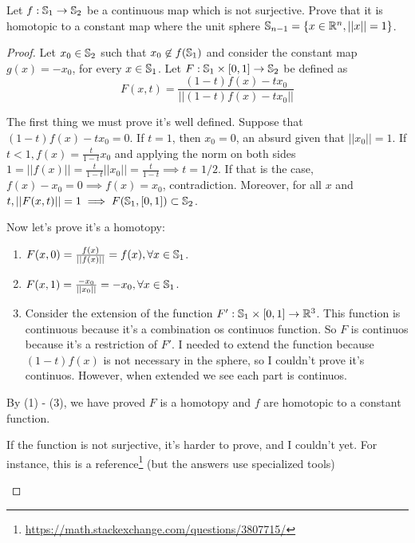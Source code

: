 \noindent\linia

\begin{exercise}
    Let $f : \mathbb{S}_1 \to \mathbb{S}_2$ be a continuous map which is not
    surjective. Prove that it is homotopic to a constant map where the unit sphere $\mathbb{S}_{n-1} = \{x \in \mathbb{R}^n,
    ||x|| = 1\}$. 
\end{exercise}

\begin{proof}

Let $x_0 \in \mathbb{S}_2$ such that $x_0 \not\in f(\mathbb{S}_1)$ and
consider the constant map $g(x) = -x_0$, for every $x \in \mathbb{S}_1$. Let
$F: \mathbb{S}_1 \times [0,1] \to \mathbb{S}_2$ be defined as 
$$
F(x,t) = \frac{(1 - t)f(x) - tx_0}{||(1 - t)f(x) - tx_0||}
$$

The first thing we must prove it's well defined. Suppose that $(1 - t)f(x) -
tx_0 = 0$. If $t = 1$, then $x_0 = 0$, an absurd given that $||x_0|| = 1$. If
$t < 1, f(x) = \frac{t}{1-t}x_0$ and applying the norm on both sides $1 =
||f(x)|| = \frac{t}{1-t}||x_0|| = \frac{t}{1-t} \implies t = 1/2$.  If that
is the case, $f(x) - x_0 = 0 \implies f(x) = x_0$, contradiction.  Moreover, for
all $x$ and $t, ||F(x,t)|| = 1 \implies F(\mathbb{S}_1, [0,1]) \subset
\mathbb{S}_2$. 

Now let's prove it's a homotopy:

\begin{enumerate}
    \item $F(x,0) = \frac{f(x)}{||f(x)||} = f(x), \forall x \in
    \mathbb{S}_1$. 

    \item $F(x,1) = \frac{-x_0}{||x_0||} = - x_0, \forall x \in
    \mathbb{S}_1$. 

    \item Consider the extension of the function $F' : \mathbb{S}_1 \times
    [0,1] \to \mathbb{R}^3$. This function is continuous because it's a combination os
    continuos function. So $F$ is continuos because it's a restriction of
    $F'$. I needed to extend the function because $(1-t)f(x)$ is not necessary
    in the sphere, so I couldn't prove it's continuos. However, when extended
    we see each part is continuos. 
\end{enumerate}

By (1) - (3), we have proved $F$ is a homotopy and $f$ are homotopic to a
constant function. 

\begin{remark}
    If the function is not surjective, it's harder to prove, and I couldn't yet.
    For instance, this is a
    reference\footnote{\url{https://math.stackexchange.com/questions/3807715/}
    } (but the answers use specialized tools) 
\end{remark}

\end{proof}

